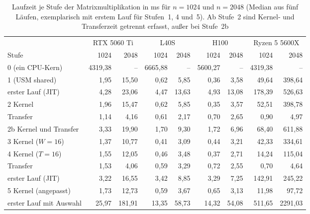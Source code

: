 \documentclass[12pt,a4paper]{article}
\begin{document}
\begin{table}[H]
\centering
\footnotesize
\setlength{\tabcolsep}{3.5pt}
\caption[Laufzeit je Stufe bei der Matrixmultiplikation (ms)]{Laufzeit je Stufe der Matrixmultiplikation in ms für $n = 1024$ und $n = 2048$ (Median aus fünf Läufen, exemplarisch mit erstem Lauf für Stufen~1, 4 und~5). Ab Stufe~2 sind Kernel- und Transferzeit getrennt erfasst, außer bei Stufe~2b}
\label{tab:zeiten}
\begin{tabular}{@{}l*{8}{r}@{}}
\toprule
 & \multicolumn{2}{c}{RTX 5060 Ti} & \multicolumn{2}{c}{L40S} & \multicolumn{2}{c}{H100} & \multicolumn{2}{c}{Ryzen 5 5600X} \\
\cmidrule(lr){2-3}\cmidrule(lr){4-5}\cmidrule(lr){6-7}\cmidrule(l){8-9}
Stufe & 1024 & 2048 & 1024 & 2048 & 1024 & 2048 & 1024 & 2048 \\
\midrule
0 (ein CPU-Kern)              & 4319,38 & --     & 6665,88 & --    & 5600,27 & --    & 4319,38 & --      \\
1 (USM shared)                & 1,95    & 15,50  & 0,62    & 5,85  & 0,36    & 3,58  & 49,64   & 398,64  \\
\quad erster Lauf (JIT)       & 4,28    & 23,06  & 4,47    & 13,63 & 4,93    & 13,08 & 178,39  & 526,63  \\
2 Kernel                      & 1,96    & 15,47  & 0,62    & 5,85  & 0,35    & 3,57  & 52,51   & 398,78  \\
\quad Transfer                & 1,14    & 4,16   & 0,61    & 2,17  & 0,70    & 2,65  & 0,90    & 4,97    \\
2b Kernel und Transfer        & 3,33    & 19,90  & 1,70    & 9,30  & 1,72    & 6,96  & 68,40   & 611,88  \\
3 Kernel ($W = 16$)           & 1,37    & 10,77  & 0,41    & 3,09  & 0,44    & 3,21  & 42,33   & 334,61  \\
4 Kernel ($T = 16$)           & 1,55    & 12,05  & 0,46    & 3,48  & 0,37    & 2,71  & 14,24   & 115,04  \\
\quad Transfer                & 1,53    & 4,06   & 0,59    & 3,29  & 0,72    & 2,55  & 0,70    & 4,64    \\
\quad erster Lauf (JIT)       & 3,22    & 16,55  & 3,42    & 8,85  & 3,29    & 7,25  & 142,91  & 245,22  \\
5 Kernel (angepasst)          & 1,73    & 12,73  & 0,59    & 3,67  & 0,65    & 3,13  & 11,98   & 97,72   \\
\quad erster Lauf mit Auswahl & 25,97   & 181,91 & 13,35   & 58,73 & 14,32   & 54,08 & 511,65  & 2291,03 \\
\bottomrule
\end{tabular}
\end{table}
\end{document}
